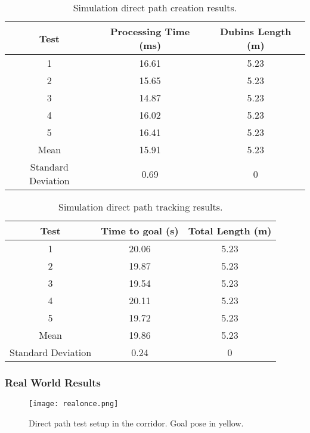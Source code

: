 \begin{table}[H]
    \centering
    \caption{Simulation direct path creation results.}
    \begin{tabular}{|c|c|c|}
        \hline
        \textbf{Test} & \textbf{Processing Time (ms)} & \textbf{Dubins Length (m)}  \\
        \hline
         1 & 16.61 & 5.23   \\
        \hline
         2 & 15.65 & 5.23  \\
         \hline
         3 & 14.87 & 5.23  \\
         \hline
         4 & 16.02 & 5.23  \\
         \hline
         5 & 16.41 & 5.23  \\
         \hline
         Mean & 15.91 & 5.23  \\
         \hline
         Standard Deviation & 0.69 & 0 \\
         \hline
    \end{tabular}
    \label{tab:direct_path_results1}
\end{table}
\begin{table}[H]
    \centering
    \caption{Simulation direct path tracking results.}
    \begin{tabular}{|c|c|c|}
        \hline
        \textbf{Test} &\textbf{Time to goal (s)} & \textbf{Total Length (m)} \\
        \hline
        1 & 20.06 & 5.23 \\
        \hline
        2 & 19.87 & 5.23 \\
         \hline
         3 & 19.54 & 5.23 \\
         \hline
         4 & 20.11 & 5.23 \\
         \hline
         5 & 19.72 & 5.23 \\
         \hline
         Mean & 19.86 & 5.23 \\
         \hline
         Standard Deviation & 0.24 & 0 \\
         \hline
    \end{tabular}
    \label{tab:direct_path_results2}
\end{table}

\clearpage
\subsubsection{Real World Results}
\begin{figure}[h]
    \centering
    \texttt{[image: realonce.png]}
    \caption{Direct path test setup in the corridor. Goal pose in yellow.}
    \label{fig:real1}
\end{figure}

